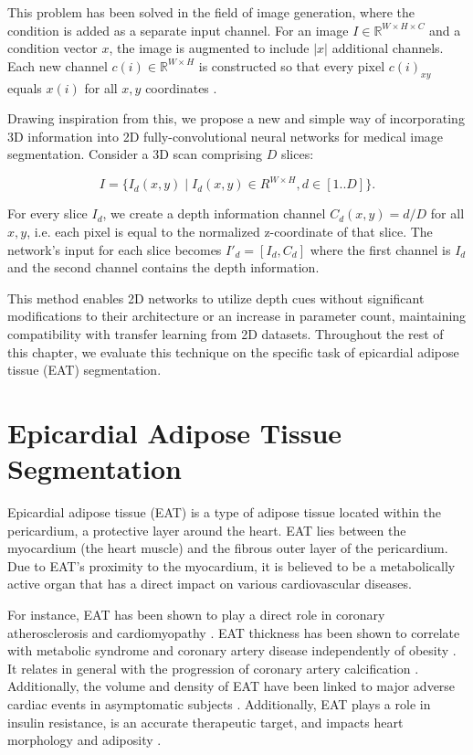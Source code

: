 This problem has been solved in the field of image generation, where the condition is added as a separate input channel. For an image \(I \in \mathbb{R}^{W \times H \times C}\) and a condition vector \(x\), the image is augmented to include \(\lvert x \rvert\) additional channels. Each new channel \(c(i) \in \mathbb{R}^{W \times H}\) is constructed so that every pixel \(c(i)_{xy}\) equals \(x(i)\) for all \(x, y\) coordinates \cite{sahariaPhotorealisticTexttoImageDiffusion2022}.

Drawing inspiration from this, we propose a new and simple way of incorporating 3D information into 2D fully-convolutional neural networks for medical image segmentation. Consider a 3D scan comprising \(D\) slices:

\begin{equation}
	I = \{I_d(x, y)\; \vert\;  I_d(x,y) \in R^{W \times H}, d \in [1..D]\}.
\end{equation}

For every slice \(I_d\), we create a depth information channel \(C_d(x, y) = d / D\) for all \(x, y\), i.e. each pixel is equal to the normalized z-coordinate of that slice. The network's input for each slice becomes $I'_{d} = [I_d, C_d]$ where the first channel is $I_d$ and the second channel contains the depth information.

This method enables 2D networks to utilize depth cues without significant modifications to their architecture or an increase in parameter count, maintaining compatibility with transfer learning from 2D datasets. Throughout the rest of this chapter, we evaluate this technique on the specific task of epicardial adipose tissue (EAT) segmentation.

\section{Epicardial Adipose Tissue Segmentation}

Epicardial adipose tissue (EAT) is a type of adipose tissue located within the pericardium, a protective layer around the heart. EAT lies between the myocardium (the heart muscle) and the fibrous outer layer of the pericardium. Due to EAT's proximity to the myocardium, it is believed to be a metabolically active organ that has a direct impact on various cardiovascular diseases.

For instance, EAT has been shown to play a direct role in coronary atherosclerosis and cardiomyopathy \cite{Sacks2007, Marwan2013}. EAT thickness has been shown to correlate with metabolic syndrome \cite{Chenn2009} and coronary artery disease independently of obesity \cite{Iacobellis2011}. It relates in general with the progression of coronary artery calcification \cite{Gorter2008}. Additionally, the volume and density of EAT have been linked to major adverse cardiac events in asymptomatic subjects \cite{Goeller2018}. Additionally, EAT plays a role in insulin resistance, is an accurate therapeutic target, and impacts heart morphology and adiposity \cite{Iacobellis2009-2}.

